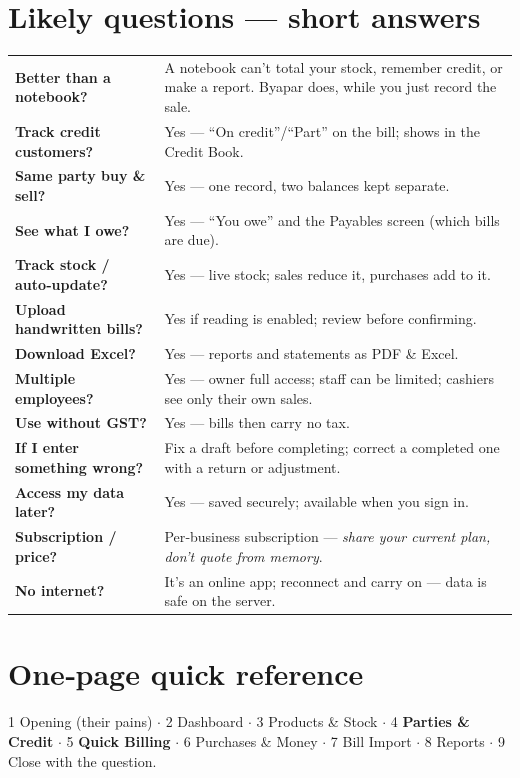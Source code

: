 \documentclass[11pt,a4paper,openany]{article}
\begin{document}
\section{Likely questions — short answers}
\small
\begin{tabularx}{\linewidth}{@{}>{\bfseries\color{navy}}p{6.0cm}X@{}}
\toprule
Better than a notebook? & A notebook can't total your stock, remember credit, or make a report. Byapar does, while you just record the sale. \\
Track credit customers? & Yes — ``On credit''/``Part'' on the bill; shows in the Credit Book. \\
Same party buy \& sell? & Yes — one record, two balances kept separate. \\
See what I owe? & Yes — ``You owe'' and the Payables screen (which bills are due). \\
Track stock / auto‑update? & Yes — live stock; sales reduce it, purchases add to it. \\
Upload handwritten bills? & Yes if reading is enabled; review before confirming. \\
Download Excel? & Yes — reports and statements as PDF \& Excel. \\
Multiple employees? & Yes — owner full access; staff can be limited; cashiers see only their own sales. \\
Use without GST? & Yes — bills then carry no tax. \\
If I enter something wrong? & Fix a draft before completing; correct a completed one with a return or adjustment. \\
Access my data later? & Yes — saved securely; available when you sign in. \\
Subscription / price? & Per‑business subscription — \emph{share your current plan, don't quote from memory}. \\
No internet? & It's an online app; reconnect and carry on — data is safe on the server. \\
\bottomrule
\end{tabularx}

\clearpage
\section{One‑page quick reference}
\begin{tcolorbox}[colback=panel,colframe=brandgreen,boxrule=0pt,leftrule=3pt,arc=3pt,
  left=10pt,right=10pt,top=8pt,bottom=8pt,fonttitle=\sffamily\bfseries\color{brandgreendark},
  title={The flow (20 min)}]
\small 1 Opening (their pains) $\cdot$ 2 Dashboard $\cdot$ 3 Products \& Stock $\cdot$
4 \textbf{Parties \& Credit} $\cdot$ 5 \textbf{Quick Billing} $\cdot$ 6 Purchases \& Money $\cdot$
7 Bill Import $\cdot$ 8 Reports $\cdot$ 9 Close with the question.
\end{tcolorbox}
\end{document}
